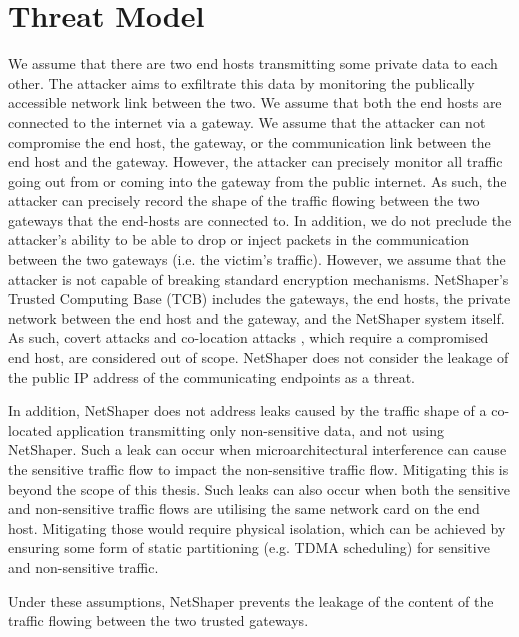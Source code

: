 \section{Threat Model}
\label{sec:netshaper-threat-model}

We assume that there are two end hosts transmitting some private data to each other.
The attacker aims to exfiltrate this data by monitoring the publically accessible network link between the two.
We assume that both the end hosts are connected to the internet via a gateway.
We assume that the attacker can not compromise the end host, the gateway, or the communication link between the end host and the gateway.
However, the attacker can precisely monitor all traffic going out from or coming into the gateway from the public internet. 
As such, the attacker can precisely record the shape of the traffic flowing between the two gateways that the end-hosts are connected to.
In addition, we do not preclude the attacker's ability to be able to drop or inject packets in the communication between the two gateways (i.e. the victim's traffic).
However, we assume that the attacker is not capable of breaking standard encryption mechanisms.
NetShaper's Trusted Computing Base (TCB) includes the gateways, the end hosts, the private network between the end host and the gateway, and the NetShaper system itself.
As such, covert attacks \cite{zhang2011predinteractive} and co-location attacks \cite{schuster2017beautyburst,mehta2022pacer}, which require a compromised end host, are considered out of scope.
NetShaper does not consider the leakage of the public IP address of the communicating endpoints as a threat.

In addition, NetShaper does not address leaks caused by the traffic shape of a co-located application transmitting only non-sensitive data, and not using NetShaper.
Such a leak can occur when microarchitectural interference can cause the sensitive traffic flow to impact the non-sensitive traffic flow. Mitigating this is beyond the scope of this thesis.
Such leaks can also occur when both the sensitive and non-sensitive traffic flows are utilising the same network card on the end host.
Mitigating those would require physical isolation, which can be achieved by ensuring some form of static partitioning (e.g. TDMA scheduling) for sensitive and non-sensitive traffic.

Under these assumptions, NetShaper prevents the leakage of the content of the traffic flowing between the two trusted gateways.